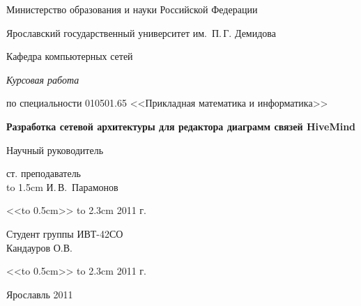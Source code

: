 \thispagestyle{empty}

\enlargethispage{2cm}
{
\begin{center}
\renewcommand{\baselinestretch}{1.25}
{
\selectfont
Министерство образования и науки Российской Федерации

Ярославский государственный университет им.~П.\,Г. Демидова

Кафедра компьютерных сетей

\vspace{6cm}

{\em Курсовая работа}

по специальности 010501.65 <<Прикладная математика и информатика>>

\vspace{0.5cm}

{ \Large \bf Разработка сетевой архитектуры для редактора диаграмм связей
HiveMind}

\vspace{3cm}

\hfill\parbox{7cm}
{ 
Научный руководитель

ст. преподаватель\\
\hbox to 1.5cm{\hrulefill} И.\,В.~Парамонов

<<\hbox to 0.5cm{\hrulefill}>> \hbox to 2.3cm{\hrulefill} 2011 г.
}

\vspace{1.5cm}

\hfill\parbox{7cm}
{ 
Студент группы ИВТ-42СО\\
Кандауров О.В.

<<\hbox to 0.5cm{\hrulefill}>> \hbox to 2.3cm{\hrulefill} 2011 г.
}

\vspace{5cm}

Ярославль 2011
}
\end{center}
}

\newpage
